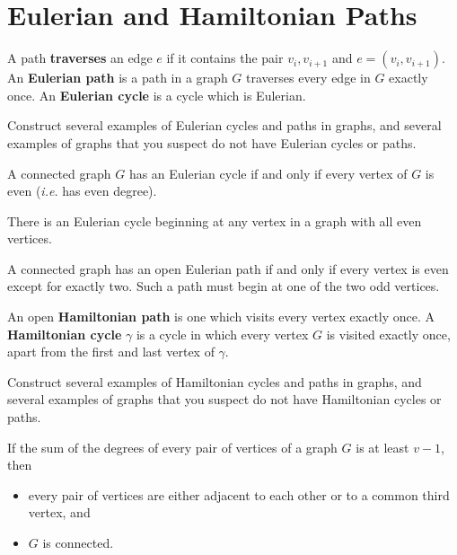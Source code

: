 \section{Eulerian and Hamiltonian Paths}\label{sec:euler}
\begin{definition} A path \textbf{traverses} an edge $e$ if it contains the pair $v_i, v_{i+1}$ and $e=(v_i, v_{i+1})$. An \textbf{Eulerian path} is a path in a graph $G$ traverses every edge in $G$ exactly once.  An \textbf{Eulerian cycle} is a cycle which is Eulerian.
\end{definition}

\begin{examples} Construct several examples of Eulerian cycles and paths in graphs, and several examples of graphs that you suspect do not have Eulerian cycles or paths.
\end{examples}

\begin{theorem} A connected graph $G$ has an Eulerian cycle if and only if every vertex of $G$ is even (\textit{i.e.} has even degree).
\end{theorem}

\begin{corollary} There is an Eulerian cycle beginning at any vertex in a graph with all even vertices.
\end{corollary}

\begin{corollary} A connected graph has an open Eulerian path if and only if every vertex is even except for exactly two.  Such a path must begin at one of the two odd vertices.
\end{corollary}

\begin{definition} An open \textbf{Hamiltonian path} is one which visits every vertex exactly once. A \textbf{Hamiltonian cycle} $\gamma$ is a cycle in which every vertex $G$ is visited exactly once, apart from the first and last vertex of $\gamma$.
\end{definition}

\begin{examples} Construct several examples of Hamiltonian cycles and paths in graphs, and several examples of graphs that you suspect do not have Hamiltonian cycles or paths.
\end{examples}

\begin{lemma} If the sum of the degrees of every pair of vertices of a graph $G$ is at least $v-1$, then
\begin{itemize}
    \item every pair of vertices are either adjacent to each other or to a common third vertex, and
    \item $G$ is connected.
\end{itemize}
\end{lemma}

